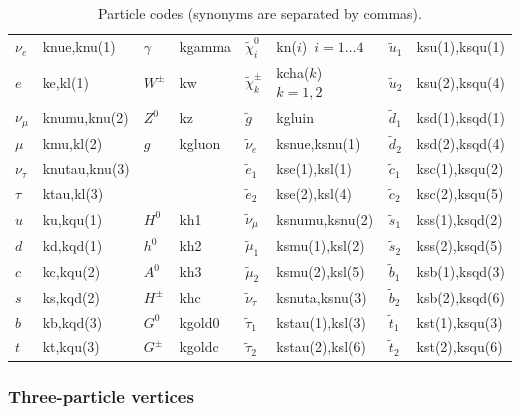 \documentclass[a4paper,10pt,oneside]{book}
\newcommand{\ft}[1]{\textsf{#1}}
\begin{document}
\begin{table}
\label{tab:2}
\caption{Particle codes (synonyms are separated by commas). }
\begin{center}
\begin{tabular}{| l l | l l | l l | l l |}
\hline
$\nu_e$ & \ft{knue,knu(1)} &
$\gamma$ & \ft{kgamma} &
$\tilde{\chi}^0_i$ & \ft{kn($i$)~$i=1\ldots4$} &
$\tilde{u}_1$ & \ft{ksu(1),ksqu(1)}
\\
$e$ & \ft{ke,kl(1)} &
$W^\pm$ & \ft{kw} &
$\tilde{\chi}^\pm_k$ & \ft{kcha($k$)~$k=1,2$} &
$\tilde{u}_2$ & \ft{ksu(2),ksqu(4)}
\\
$\nu_\mu$ & \ft{knumu,knu(2)} &
$Z^0$ & \ft{kz} &
$\tilde{g}$ & \ft{kgluin} &
$\tilde{d}_1$ & \ft{ksd(1),ksqd(1)}
\\
$\mu$ & \ft{kmu,kl(2)} &
$g$ & \ft{kgluon} &
$\tilde{\nu}_e$ & \ft{ksnue,ksnu(1)} &
$\tilde{d}_2$ & \ft{ksd(2),ksqd(4)}
\\
$\nu_\tau$ & \ft{knutau,knu(3)} &
&&
$\tilde{e}_1$ & \ft{kse(1),ksl(1)} & 
$\tilde{c}_1$ &\ft{ksc(1),ksqu(2)}
\\
$\tau$ & \ft{ktau,kl(3)} &
&&
$\tilde{e}_2$ & \ft{kse(2),ksl(4)} & 
$\tilde{c}_2$ &\ft{ksc(2),ksqu(5)}
\\
$u$ & \ft{ku,kqu(1)} &
$H^0$ & \ft{kh1} &
$\tilde{\nu}_\mu$ &\ft{ksnumu,ksnu(2)} &
$\tilde{s}_1$ &\ft{kss(1),ksqd(2)}
\\
$d$ & \ft{kd,kqd(1)} & 
$h^0$ & \ft{kh2} & 
$\tilde{\mu}_1$ &\ft{ksmu(1),ksl(2)} &
$\tilde{s}_2$ &\ft{kss(2),ksqd(5)}
\\
$c$ &\ft{kc,kqu(2)} &
$A^0$ & \ft{kh3} &
$\tilde{\mu}_2$ &\ft{ksmu(2),ksl(5)} &
$\tilde{b}_1$ &\ft{ksb(1),ksqd(3)}
\\
$s$ &\ft{ks,kqd(2)} &
$H^\pm$ & \ft{khc} &
$\tilde{\nu}_\tau$ &\ft{ksnuta,ksnu(3)} &
$\tilde{b}_2$ &\ft{ksb(2),ksqd(6)}
\\
$b$ &\ft{kb,kqd(3)} &
$G^0$ & \ft{kgold0} &
$\tilde{\tau}_1$ & \ft{kstau(1),ksl(3)} &
$\tilde{t}_1$ & \ft{kst(1),ksqu(3)}
\\
$t$ &\ft{kt,kqu(3)} &
$G^\pm$ & \ft{kgoldc} &
$\tilde{\tau}_2$ & \ft{kstau(2),ksl(6)} &
$\tilde{t}_2$ & \ft{kst(2),ksqu(6)}
\\
\hline
\end{tabular}
\end{center}
\end{table}

\subsubsection{Three-particle vertices}
\end{document}
